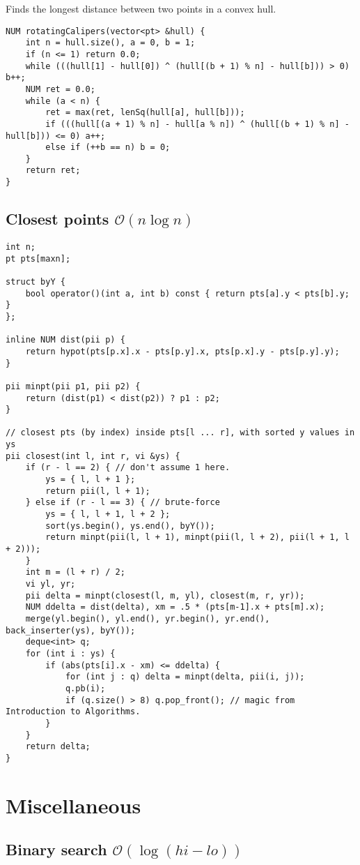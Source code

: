 \documentclass[8pt,a4paper,landscape,oneside]{amsart}
\begin{document}
\begin{multicols*}{3}
Finds the longest distance between two points in a convex hull.

\begin{lstlisting}
NUM rotatingCalipers(vector<pt> &hull) {
	int n = hull.size(), a = 0, b = 1;
	if (n <= 1) return 0.0;
	while (((hull[1] - hull[0]) ^ (hull[(b + 1) % n] - hull[b])) > 0) b++;
	NUM ret = 0.0;
	while (a < n) {
		ret = max(ret, lenSq(hull[a], hull[b]));
		if (((hull[(a + 1) % n] - hull[a % n]) ^ (hull[(b + 1) % n] - hull[b])) <= 0) a++;
		else if (++b == n) b = 0;
	}
	return ret;
}
\end{lstlisting}

\subsection{Closest points $\mathcal{O}(n \log n)$}

\begin{lstlisting}
int n;
pt pts[maxn];

struct byY {
	bool operator()(int a, int b) const { return pts[a].y < pts[b].y; }
};

inline NUM dist(pii p) {
	return hypot(pts[p.x].x - pts[p.y].x, pts[p.x].y - pts[p.y].y);
}

pii minpt(pii p1, pii p2) {
	return (dist(p1) < dist(p2)) ? p1 : p2;
}

// closest pts (by index) inside pts[l ... r], with sorted y values in ys
pii closest(int l, int r, vi &ys) {
	if (r - l == 2) { // don't assume 1 here.
		ys = { l, l + 1 };
		return pii(l, l + 1);
	} else if (r - l == 3) { // brute-force
		ys = { l, l + 1, l + 2 };
		sort(ys.begin(), ys.end(), byY());
		return minpt(pii(l, l + 1), minpt(pii(l, l + 2), pii(l + 1, l + 2)));
	}
	int m = (l + r) / 2;
	vi yl, yr;
	pii delta = minpt(closest(l, m, yl), closest(m, r, yr));
	NUM ddelta = dist(delta), xm = .5 * (pts[m-1].x + pts[m].x);
	merge(yl.begin(), yl.end(), yr.begin(), yr.end(), back_inserter(ys), byY());
	deque<int> q;
	for (int i : ys) {
		if (abs(pts[i].x - xm) <= ddelta) {
			for (int j : q) delta = minpt(delta, pii(i, j));
			q.pb(i);
			if (q.size() > 8) q.pop_front(); // magic from Introduction to Algorithms.
		}
	}
	return delta;
}
\end{lstlisting}

\section{Miscellaneous}
\subsection{Binary search $\mathcal{O}(\log (hi - lo))$}


\end{multicols*}
\end{document}
